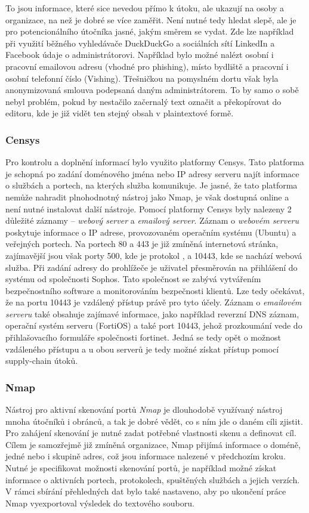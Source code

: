 To jsou informace, které sice nevedou přímo k útoku, ale ukazují na osoby a organizace, na než je dobré se více zaměřit.
Není nutné tedy hledat slepě, ale je pro potencionálního útočníka jasné, jakým směrem se vydat.
Zde lze například při využití běžného vyhledávače DuckDuckGo a sociálních sítí LinkedIn a Facebook údaje o administrátorovi.
Například bylo možné nalézt osobní i pracovní emailovou adresu (vhodné pro phishing), místo bydliště a pracovní i osobní telefonní číslo (Vishing).
Třešničkou na pomyslném dortu však byla anonymizovaná smlouva podepsaná daným administrátorem.
To by samo o sobě nebyl problém, pokud by nestačilo začernalý text označit a překopírovat do editoru, kde je již vidět ten stejný obsah v plaintextové formě.

\subsubsection{Censys}
Pro kontrolu a doplnění informací bylo využito platformy Censys.
Tato platforma je schopná po zadání doménového jména nebo IP adresy serveru najít informace o službách a portech, na kterých služba komunikuje.
Je jasné, že tato platforma nemůže nahradit plnohodnotný nástroj jako Nmap, je však dostupná online a není nutné instalovat další nástroje.
Pomocí platformy Censys byly nalezeny 2 důležité záznamy -- \textit{webový server} a \textit{emailový server}.
Záznam o \textit{webovém serveru} poskytuje informace o IP adrese, provozovaném operačním systému (Ubuntu) a veřejných portech.
Na portech 80 a 443 je již zmíněná internetová stránka, zajímavější jsou však porty 500, kde je protokol , a 10443, kde se nachází webová služba.
Při zadání adresy do prohlížeče je uživatel přesměrován na přihlášení do systému od společnosti Sophos.
Tato společnost se zabývá vytvářením bezpečnostního software a monitorováním bezpečnosti klientů.
Lze tedy očekávat, že na portu 10443 je vzdálený přístup právě pro tyto účely.
Záznam o \textit{emailovém serveru} také obsahuje zajímavé informace, jako například reverzní \ac{DNS} záznam, operační systém serveru (FortiOS) a také port 10443, jehož prozkoumání vede do přihlašovacího formuláře společnosti fortinet.
Jedná se tedy opět o možnost vzdáleného přístupu a u obou serverů je tedy možné získat přístup pomocí supply-chain útoků.

\subsubsection{Nmap}
Nástroj pro aktivní skenování portů \textit{Nmap} je dlouhodobě využívaný nástroj mnoha útočníků i obránců, a tak je dobré vědět, co s ním jde o daném cíli zjistit.
Pro zahájení skenování je nutné zadat potřebné vlastnosti skenu a definovat cíl.
Cílem je samozřejmě již zmíněná organizace, Nmap přijímá informace o doméně, jedné nebo i skupině adres, což jsou informace nalezené v předchozím kroku.
Nutné je specifikovat možnosti skenování portů, je například možné získat informace o aktivních portech, protokolech, spuštěných službách a jejich verzích.
V rámci sbírání přehledných dat bylo také nastaveno, aby po ukončení práce Nmap vyexportoval výsledek do textového souboru.

